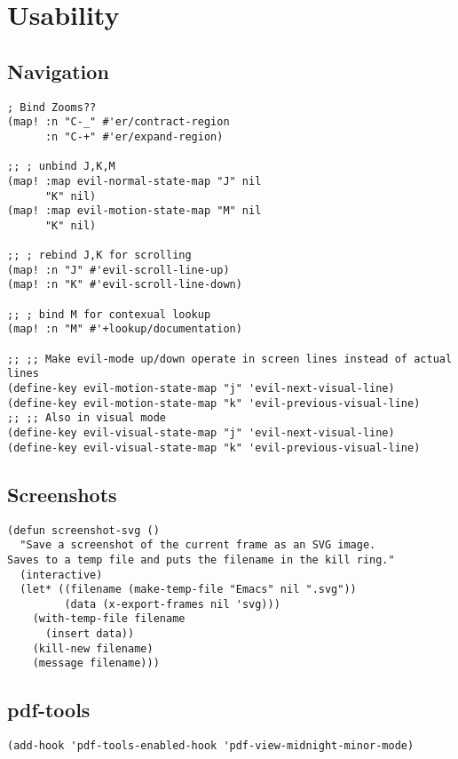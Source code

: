 \documentclass[8pt]{article}
\begin{document}
\section{Usability}
\label{sec:org578fd5b}
\subsection{Navigation}
\label{sec:org047ad75}
\begin{verbatim}
; Bind Zooms??
(map! :n "C-_" #'er/contract-region
      :n "C-+" #'er/expand-region)

;; ; unbind J,K,M
(map! :map evil-normal-state-map "J" nil
      "K" nil)
(map! :map evil-motion-state-map "M" nil
      "K" nil)

;; ; rebind J,K for scrolling
(map! :n "J" #'evil-scroll-line-up)
(map! :n "K" #'evil-scroll-line-down)

;; ; bind M for contexual lookup
(map! :n "M" #'+lookup/documentation)

;; ;; Make evil-mode up/down operate in screen lines instead of actual lines
(define-key evil-motion-state-map "j" 'evil-next-visual-line)
(define-key evil-motion-state-map "k" 'evil-previous-visual-line)
;; ;; Also in visual mode
(define-key evil-visual-state-map "j" 'evil-next-visual-line)
(define-key evil-visual-state-map "k" 'evil-previous-visual-line)
\end{verbatim}
\subsection{Screenshots}
\label{sec:org6ab1ba9}
\begin{verbatim}
(defun screenshot-svg ()
  "Save a screenshot of the current frame as an SVG image.
Saves to a temp file and puts the filename in the kill ring."
  (interactive)
  (let* ((filename (make-temp-file "Emacs" nil ".svg"))
         (data (x-export-frames nil 'svg)))
    (with-temp-file filename
      (insert data))
    (kill-new filename)
    (message filename)))
\end{verbatim}
\subsection{pdf-tools}
\label{sec:orgc058279}
\begin{verbatim}
(add-hook 'pdf-tools-enabled-hook 'pdf-view-midnight-minor-mode)
\end{verbatim}
\end{document}
